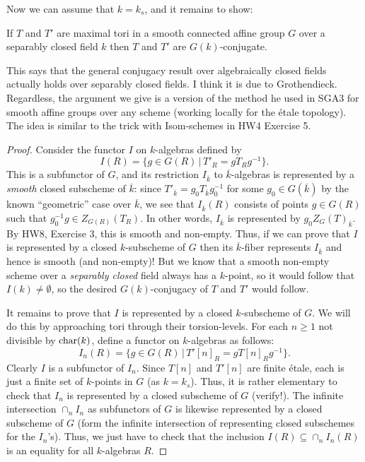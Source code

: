 \documentclass[10pt]{article}
\renewcommand{\(}{\left(}
\renewcommand{\)}{\right)}
\numberwithin{thm}{subsection}
\begin{document}
Now we can assume that $k = k_s$, and it remains to show:

\begin{proposition} If $T$ and $T'$ are maximal tori in a smooth connected
affine group $G$ over a separably closed field $k$ then $T$ and $T'$ are $G(k)$-conjugate.
\end{proposition}

This says that the general conjugacy result over algebraically closed fields actually holds over separably
closed fields.  
I think it is due to Grothendieck.  Regardless, the argument we give is a version of the method he
used in SGA3 for smooth affine groups over any scheme (working locally for the \'etale topology). 
 The idea is similar to the trick with Isom-schemes in
HW4 Exercise 5.

\begin{proof}
Consider the functor $I$ on $k$-algebras defined by
$$I(R) = \{g \in G(R)\,|\,T'_R = gT_R g^{-1}\}.$$
This is a subfunctor of $G$, and its restriction 
$I_{\overline{k}}$ to $\overline{k}$-algebras is represented by a {\em smooth} closed
subscheme of $\overline{k}$:  since $T'_{\overline{k}} = g_0 T_{\overline{k}}  g_0^{-1}$ 
for some $g_0 \in G(\overline{k})$ by the known ``geometric'' case over $\overline{k}$, 
we see that $I_{\overline{k}}(R)$ consists of points $g \in G(R)$ such that $g_0^{-1}g \in Z_{G(R)}(T_R)$.
In other words, $I_{\overline{k}}$ is represented by $g_0 Z_G(T)_{\overline{k}}$.   By HW8, Exercise 3,
this is smooth and non-empty.  Thus, if we can prove that $I$ is represented by a closed
$k$-subscheme of $G$ then its $\overline{k}$-fiber represents $I_{\overline{k}}$
and hence is smooth (and non-empty)!   But we know that a smooth non-empty
scheme over a {\em separably closed} field always has a $k$-point, so it would
follow that $I(k) \ne \emptyset$, so the desired $G(k)$-conjugacy of $T$ and $T'$ would follow.

It remains to prove that $I$ is represented by a closed $k$-subscheme of $G$.  We will do this
by approaching tori through their torsion-levels.  For each $n \ge 1$ not divisible by
${\rm{char}}(k)$, define a functor on $k$-algebras as follows:
$$I_n(R) = \{g \in G(R)\,|\,T'[n]_R = g T[n]_R g^{-1}\}.$$
Clearly $I$ is a subfunctor of $I_n$. 
Since $T[n]$ and $T'[n]$ are finite \'etale, each is just a finite set of
$k$-points in $G$ (as $k = k_s$).  Thus, it is rather elementary to check
that $I_n$ is represented by a closed subscheme of $G$ (verify!). 
The infinite intersection $\cap_n I_n$ as subfunctors of $G$ is likewise
represented by a closed subscheme of $G$ (form the infinite intersection
of representing closed subschemes for the $I_n$'s).  Thus, we just have to check
that the inclusion $I(R) \subseteq \cap_n I_n(R)$ is an equality for all
$k$-algebras $R$.  


\end{proof}
\end{document}
